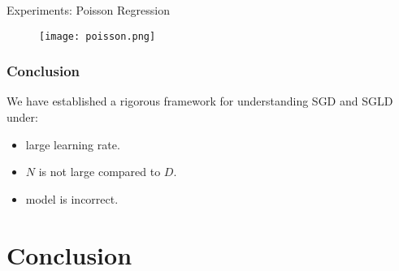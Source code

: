 \documentclass[10pt,xcolor=table]{beamer}
\begin{document}
\begin{frame}{Experiments: Poisson Regression}
	\begin{figure}
		\centering
		\texttt{[image: poisson.png]} 
	\end{figure}
%	
\end{frame}





\begin{frame}
  \frametitle{Conclusion}
We have established a rigorous framework for understanding SGD and SGLD under:
\begin{itemize}
	\item  large learning rate. 
	\item $N$ is not large compared to $D$.
	\item model is incorrect.
\end{itemize}
\end{frame}

\section{Conclusion}
\end{document}
